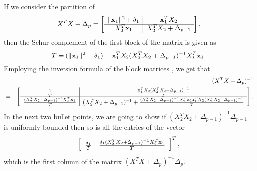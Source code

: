 \documentclass[noinfoline,11pt]{imsart}
\numberwithin{equation}{section}
\theoremstyle{plain}
\newcommand{\lmDelta}{\Delta}
\newcommand{\lmdelta}{\delta}
\newcommand{\lmX}{X}
\newcommand{\R}{\mathbb{R}}
\newcommand{\norm}[1]{ \Vert #1 \Vert }
\newcommand{\lmA}{A}
\newcommand{\lma}{a}
\newcommand{\lmabf}{{\bf a}}
\newcommand{\lmxbf}{{\bf x}}
\begin{document}
 \proof
%  
If we  consider the partition of 
$$
\lmX^T\lmX+\lmDelta_p=\left[
\begin{array}{c|c}
\norm{\lmxbf_{1}}^2+\lmdelta_1 &     \lmxbf_1^T\lmX_2 \\ \hline
  \lmX_2^T\lmxbf_1 &\lmX_2^T\lmX_2+\lmDelta_{p-1}
\end{array}\right],
$$
then the Schur complement of the first block of the matrix is given as 
$$T= (\norm{\lmxbf_{1}}^2+\lmdelta_1)- \lmxbf_1^T\lmX_2 (\lmX_2^T\lmX_2+\lmDelta_{p-1})^{-1}\lmX_2^T\lmxbf_1.$$
 Employing the inversion formula of the block matrices  \citep{lu2002inverses}, we get that 
 \begin{eqnarray}\label{eq:lmStep1}
 & & (\lmX^T\lmX+\lmDelta_p)^{-1} \nonumber\\
 & = &  \left[\begin{array}{c|c}
\frac{1}{T}      &  \frac{\lmxbf_1^T\lmX_2(\lmX_2^T\lmX_2+\lmDelta_{p-1})^{-1}}{T}      \\ \hline
 \frac{(\lmX_2^T\lmX_2+\lmDelta_{p-1})^{-1} \lmX_2^T\lmxbf_1}{T}    &   (\lmX_2^T\lmX_2+\lmDelta_{p-1})^{-1}+\frac{(\lmX_2^T\lmX_2+\lmDelta_{p-1})^{-1}   \lmX_2^T\lmxbf_1\lmxbf_1^T\lmX_2  (\lmX_2^T\lmX_2+\lmDelta_{p-1})^{-1}}{T} \nonumber
\end{array}\right].
\end{eqnarray}  
 In the next two bullet points, we are going to show if  $(\lmX_2^T\lmX_2+\lmDelta_{p-1})^{-1}\lmDelta_{p-1}$ is uniformly bounded then so is all the entries of the vector $$ \left[\begin{array}{cc}
\frac{\lmdelta_1}{T}  & \frac{ \lmdelta_1 (\lmX_2^T\lmX_2+\lmDelta_{p-1})^{-1} \lmX_2^T\lmxbf_1}{T}            
\end{array}\right]^T,  $$
which is the first column of the matrix $(\lmX^T\lmX+\lmDelta_p)^{-1}\lmDelta_p $.
\end{document}
